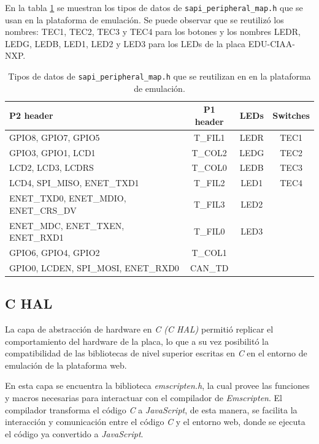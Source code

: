 En la tabla \ref{tab:ConfiguracionGPIO} se muestran los tipos de datos de \texttt{sapi\_peripheral\_map.h} que se usan en la plataforma de emulación. Se puede observar que se reutilizó los nombres: TEC1, TEC2, TEC3 y TEC4 para los botones y los nombres LEDR, LEDG, LEDB, LED1, LED2 y LED3 para los LEDs de la placa EDU-CIAA-NXP.

\begin{table}[h]
	\centering
	\caption[\texttt{sapi\_peripheral\_map.h}.]{Tipos de datos de \texttt{sapi\_peripheral\_map.h} que se reutilizan en en la plataforma de emulación.}
	\begin{tabular}{l c c c}    
		\toprule
		\textbf{P2 header} & \textbf{P1 header} & \textbf{LEDs}  & \textbf{Switches}\\
		\midrule
		GPIO8, GPIO7, GPIO5 & T\_FIL1 &  LEDR &  TEC1\\		
		GPIO3, GPIO1, LCD1 & T\_COL2  & LEDG &  TEC2\\
		LCD2, LCD3, LCDRS & T\_COL0 & LEDB &  TEC3\\
		LCD4, SPI\_MISO, ENET\_TXD1 & T\_FIL2 & LED1 & TEC4\\
		ENET\_TXD0, ENET\_MDIO, ENET\_CRS\_DV & T\_FIL3 & LED2 & \\
	    ENET\_MDC, ENET\_TXEN, ENET\_RXD1 & T\_FIL0 & LED3 & \\
	    GPIO6, GPIO4, GPIO2 & T\_COL1&  & \\
	    GPIO0, LCDEN, SPI\_MOSI, ENET\_RXD0 & CAN\_TD&  & \\
		\bottomrule
		\hline
	\end{tabular}
	\label{tab:ConfiguracionGPIO}
\end{table}

\subsection{C HAL}

La capa de abstracción de hardware en \textit{C (C HAL)}  permitió replicar el comportamiento del hardware de la placa, lo que a su vez posibilitó la compatibilidad de las bibliotecas de nivel superior escritas en \textit{C} en el entorno de emulación de la plataforma web.

En esta capa se encuentra la biblioteca \textit{emscripten.h}, la cual provee las funciones y macros necesarias para interactuar con el compilador de \textit{Emscripten}. El compilador transforma el código \textit{C} a \textit{JavaScript}, de esta manera, se facilita la interacción y comunicación entre el código \textit{C} y el entorno web, donde se ejecuta el código ya convertido a \textit{JavaScript}.

